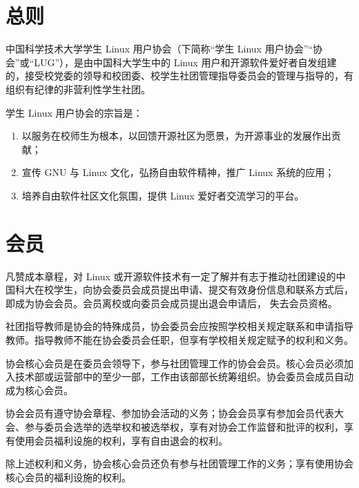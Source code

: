 


	\maketitle
	
	\tableofcontents
	
	\pagestyle{otherpage}
	\thispagestyle{firstpage}
	
	\section{总则}
	\term 中国科学技术大学学生 Linux 用户协会（下简称“学生 Linux 用户协会”“协会”或“LUG”），是由中国科大学生中的 Linux 用户和开源软件爱好者自发组建的，接受校党委的领导和校团委、校学生社团管理指导委员会的管理与指导的，有组织有纪律的非营利性学生社团。
	
	\term 学生 Linux 用户协会的宗旨是：
	\begin{enumerate}
		\item 以服务在校师生为根本，以回馈开源社区为愿景，为开源事业的发展作出贡献；
		\item 宣传 GNU 与 Linux 文化，弘扬自由软件精神，推广 Linux 系统的应用；
		\item 培养自由软件社区文化氛围，提供 Linux 爱好者交流学习的平台。
	\end{enumerate}
	
	\section{会员}
	
	\term 凡赞成本章程，对 Linux 或开源软件技术有一定了解并有志于推动社团建设的中国科大在校学生，向协会委员会成员提出申请、提交有效身份信息和联系方式后，即成为协会会员。会员离校或向委员会成员提出退会申请后， 失去会员资格。
	
	社团指导教师是协会的特殊成员，协会委员会应按照学校相关规定联系和申请指导教师。指导教师不能在协会委员会任职，但享有学校相关规定赋予的权利和义务。
	
	\term 协会核心会员是在委员会领导下，参与社团管理工作的协会会员。核心会员必须加入技术部或运营部中的至少一部，工作由该部部长统筹组织。协会委员会成员自动成为核心会员。
	
	\term 协会会员有遵守协会章程、参加协会活动的义务；协会会员享有参加会员代表大会、参与委员会选举的选举权和被选举权，享有对协会工作监督和批评的权利，享有使用会员福利设施的权利，享有自由退会的权利。
	
	除上述权利和义务，协会核心会员还负有参与社团管理工作的义务；享有使用协会核心会员的福利设施的权利。
	
